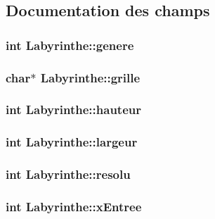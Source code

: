 \subsection{Documentation des champs}
\hypertarget{structLabyrinthe_ac74b66a45b9e340fcb9857701316d348}{
\subsubsection[{genere}]{\setlength{\rightskip}{0pt plus 5cm}int Labyrinthe\-::genere}}\label{structLabyrinthe_ac74b66a45b9e340fcb9857701316d348}
\hypertarget{structLabyrinthe_a5a95fe6fa4f565d397c586f3b5988ab1}{
\subsubsection[{grille}]{\setlength{\rightskip}{0pt plus 5cm}char$\ast$ Labyrinthe\-::grille}}\label{structLabyrinthe_a5a95fe6fa4f565d397c586f3b5988ab1}
\hypertarget{structLabyrinthe_ab7faa6700dd69e633b1d6c1c8d1974a1}{
\subsubsection[{hauteur}]{\setlength{\rightskip}{0pt plus 5cm}int Labyrinthe\-::hauteur}}\label{structLabyrinthe_ab7faa6700dd69e633b1d6c1c8d1974a1}
\hypertarget{structLabyrinthe_a23007607a374817790805e23ed1be08c}{
\subsubsection[{largeur}]{\setlength{\rightskip}{0pt plus 5cm}int Labyrinthe\-::largeur}}\label{structLabyrinthe_a23007607a374817790805e23ed1be08c}
\hypertarget{structLabyrinthe_ad27777cb14b150736ce76ce2182b2968}{
\subsubsection[{resolu}]{\setlength{\rightskip}{0pt plus 5cm}int Labyrinthe\-::resolu}}\label{structLabyrinthe_ad27777cb14b150736ce76ce2182b2968}
\hypertarget{structLabyrinthe_a58b3b04b825e29eaa7b3e8750261dcd1}{
\subsubsection[{x\-Entree}]{\setlength{\rightskip}{0pt plus 5cm}int Labyrinthe\-::x\-Entree}}\label{structLabyrinthe_a58b3b04b825e29eaa7b3e8750261dcd1}
